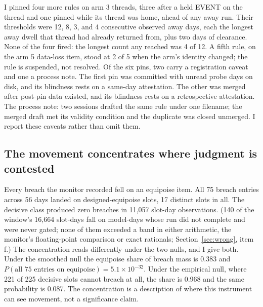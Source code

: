 \documentclass[conference]{IEEEtran}
\begin{document}
I pinned four more rules on arm 3 threads, three after a held EVENT on
the thread and one pinned while its thread was home, ahead of any away
run. Their thresholds were 12, 8, 3, and 4 consecutive observed away
days, each the longest away dwell that thread had already returned
from, plus two days of clearance. None of the four fired: the longest
count any reached was 4 of 12. A fifth rule, on the arm 5 data-loss
item, stood at 2 of 5 when the arm's identity changed; the rule is
suspended, not resolved. Of the six pins, two carry a registration
caveat and one a process note. The first pin was committed with unread
probe days on disk, and its blindness rests on a same-day attestation.
The other was merged after post-pin data existed, and its blindness
rests on a retrospective attestation. The process note: two sessions
drafted the same rule under one filename; the merged draft met its
validity condition and the duplicate was closed unmerged. I report
these caveats rather than omit them.

\subsection{The movement concentrates where judgment is contested}
\label{sec:conc}

Every breach the monitor recorded fell on an equipoise item. All 75
breach entries across 56 days landed on designed-equipoise slots, 17
distinct slots in all. The decisive class produced zero breaches in
11,057 slot-day observations. (140 of the window's 16,664 slot-days
fall on model-days whose run did not complete and were never gated;
none of them exceeded a band in either arithmetic, the monitor's
floating-point comparison or exact rationals; Section~\ref{sec:wrong},
item f.) The concentration reads differently under the two nulls, and
I give both. Under the smoothed null the equipoise share of breach
mass is 0.383 and $P(\text{all 75 entries on equipoise}) =
5.1\times10^{-32}$. Under the empirical null, where 221 of 225
decisive slots cannot breach at all, the share is 0.968 and the same
probability is 0.087. The concentration is a description of where this
instrument can see movement, not a significance claim.
\end{document}
